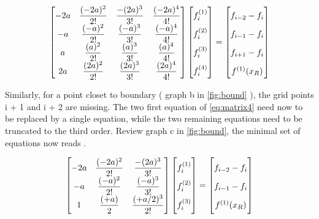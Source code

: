 \begin{align}
\begin{bmatrix} \label{eq:matrix4}
    -2a & \dfrac{(-2a)^2}{2!} & \dfrac{-(2a)^3}{3!} & \dfrac{(-2a)^4}{4!}\\
    -a & \dfrac{(-a)^2}{2!} & \dfrac{(-a)^3}{3!} & \dfrac{(-a)^4}{4!}\\
    a & \dfrac{(a)^2}{2!} & \dfrac{(a)^3}{3!} & \dfrac{(a)^4}{4!}\\
    2a & \dfrac{(2a)^2}{2!} & \dfrac{(2a)^3}{3!} & \dfrac{(2a)^4}{4!}
\end{bmatrix}
\begin{bmatrix}
    f_i^{(1)}  \vphantom{ \dfrac{d^4}{d} }\\
    f_i^{(2)}  \vphantom{ \dfrac{d^4}{d} } \\
    f_i^{(3)}  \vphantom{ \dfrac{d^4}{d} } \\
    f_i^{(4)}  \vphantom{ \dfrac{d^4}{d} }
\end{bmatrix}
=
\begin{bmatrix}
    f_{i-2} - f_{i}    \vphantom{ \dfrac{d^4}{d}} \\
    f_{i-1} - f_{i}    \vphantom{ \dfrac{d^4}{d}} \\
    f_{i+1} - f_{i}    \vphantom{ \dfrac{d^4}{d}} \\
    f^{(1)}(x_R)   \vphantom{ \dfrac{d^4}{d}}
\end{bmatrix}
\end{align}

Similarly, for a point closet to boundary ( graph b in \ref{fig:bound} ), the grid points i + 1 and i + 2 are missing. The two first equation of  \ref{eq:matrix4} need now to be replaced by a single equation, while the two remaining equations need to be truncated to the third order. Review graph c in \ref{fig:bound}, the minimal set of equations now reads \cite{methods}.

\begin{align} \label{eq:matrix3}
\begin{bmatrix}
    -2a & \dfrac{(-2a)^2}{2!} & \dfrac{-(2a)^3}{3!}\\
    -a & \dfrac{(-a)^2}{2!} & \dfrac{(-a)^3}{3!}\\
    1 & \dfrac{(+a)}{2} & \dfrac{(+a/2)^3}{2!}
\end{bmatrix}
\begin{bmatrix}
    f_i^{(1)}  \vphantom{ \dfrac{d^4}{d} }\\
    f_i^{(2)}  \vphantom{ \dfrac{d^4}{d} } \\
    f_i^{(3)}  \vphantom{ \dfrac{d^4}{d} }
\end{bmatrix}
=
\begin{bmatrix}
    f_{i-2} - f_{i}    \vphantom{ \dfrac{d^4}{d}} \\
    f_{i-1} - f_{i}    \vphantom{ \dfrac{d^4}{d}} \\
    f^{(1)}(x_R)   \vphantom{ \dfrac{d^4}{d}}
\end{bmatrix}
\end{align}


